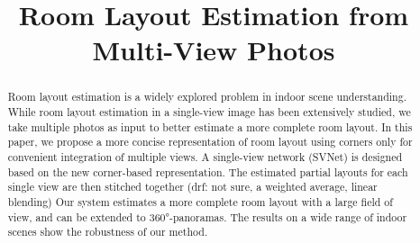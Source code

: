 \documentclass[sigconf]{acmart}
\newcommand{\comments}[1]{}
\newcommand{\xj}[1]{{\color{red}{xj:#1}}}
\newcommand{\drf}[1]{\textcolor[rgb]{0.00,0.50,1.00}{(drf: #1)}}
\begin{document}
\title{Room Layout Estimation from Multi-View Photos}

\comments{
\author{Ruifeng Deng}
\orcid{1234-5678-9012}
\affiliation{%
  \institution{University of Science and Technology of China}
  \streetaddress{P.O. Box 1212}
  \city{Hefei}
  \country{China}
  \postcode{43017-6221}
}
\email{trovato@corporation.com}

\author{Chaoyu Xie}
\affiliation{%
  \institution{University of Science and Technology of China}
  \streetaddress{P.O. Box 1212}
  \city{Hefei}
  \country{China}
  \postcode{43017-6221}
}
\email{webmaster@marysville-ohio.com}

\author{Xuejin Chen}
\affiliation{%
  \institution{University of Science and Technology of China}
  \streetaddress{1 Th{\o}rv{\"a}ld Circle}
  \city{Hefei}
  \country{China}}
\email{larst@affiliation.org}


\renewcommand{\shortauthors}{B. Trovato et al.}
}

\begin{abstract}
Room layout estimation is a widely explored problem in indoor scene understanding. %
While room layout estimation in a single-view image has been extensively studied, we take multiple photos as input to better estimate a more complete room layout. 
% 
In this paper, we propose a more concise representation of room layout using corners only for convenient integration of multiple views. 
% 
A single-view network (SVNet) is designed based on the new corner-based representation. 
The estimated partial layouts for each single view are then stitched together \xj{in a simple average manner.} \drf{not sure, a weighted average, linear blending}
Our system estimates a more complete room layout with a large field of view, and can be extended to \ang{360}-panoramas. 
The results on a wide range of indoor scenes show the robustness of our method. 
\end{abstract}
\end{document}

